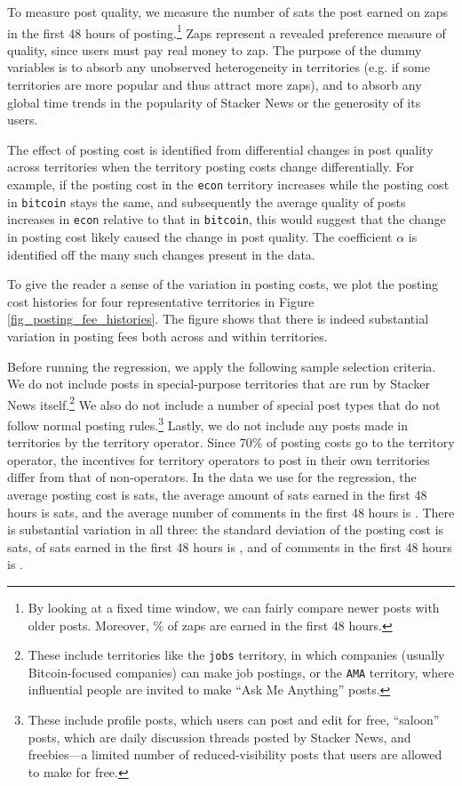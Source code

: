 To measure post quality, we measure the number of sats the post earned on zaps in the first 48 hours of posting.\footnote{By looking at a fixed time window, we can fairly compare newer posts with older posts. Moreover, \% of zaps are earned in the first 48 hours.} Zaps represent a revealed preference measure of quality, since users must pay real money to zap. The purpose of the dummy variables is to absorb any unobserved heterogeneity in territories (e.g. if some territories are more popular and thus attract more zaps), and to absorb any global time trends in the popularity of Stacker News or the generosity of its users.

The effect of posting cost is identified from differential changes in post quality across territories when the territory posting costs change differentially. For example, if the posting cost in the \texttt{econ} territory increases while the posting cost in \texttt{bitcoin} stays the same, and subsequently the average quality of posts increases in \texttt{econ} relative to that in \texttt{bitcoin}, this would suggest that the change in posting cost likely caused the change in post quality. The coefficient $\alpha$ is identified off the many such changes present in the data.

To give the reader a sense of the variation in posting costs, we plot the posting cost histories for four representative territories in Figure \ref{fig_posting_fee_histories}. The figure shows that there is indeed substantial variation in posting fees both across and within territories. 

Before running the regression, we apply the following sample selection criteria. We do not include posts in special-purpose territories that are run by Stacker News itself.\footnote{These include territories like the \texttt{jobs} territory, in which companies (usually Bitcoin-focused companies) can make job postings, or the \texttt{AMA} territory, where influential people are invited to make ``Ask Me Anything'' posts.}  We also do not include a number of special post types that do not follow normal posting rules.\footnote{These include profile posts, which users can post and edit for free, ``saloon'' posts, which are daily discussion threads posted by Stacker News, and freebies---a limited number of reduced-visibility posts that users are allowed to make for free.} Lastly, we do not include any posts made in territories by the territory operator. Since 70\% of posting costs go to the territory operator, the incentives for territory operators to post in their own territories differ from that of non-operators. In the data we use for the regression, the average posting cost is  sats, the average amount of sats earned in the first 48 hours is  sats, and the average number of comments in the first 48 hours is . There is substantial variation in all three: the standard deviation of the posting cost is  sats, of sats earned in the first 48 hours is , and of comments in the first 48 hours is . 



